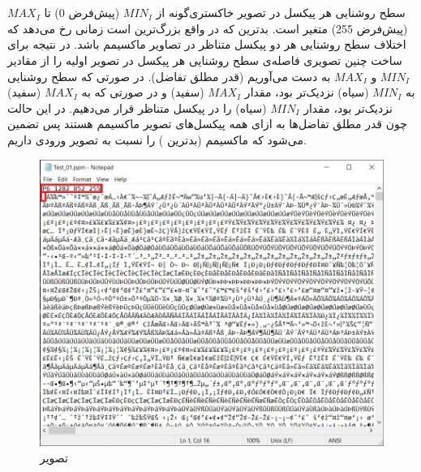 \documentclass{article}
\begin{document}
\section{}%
سطح روشنایی هر پیکسل در تصویر خاکستری‌گونه از $MIN_{I}$ (پیش‌فرض 0) تا $MAX_{I}$ (پیش‌فرض 255) متغیر است. بدترین  که در واقع بزرگ‌ترین  است زمانی رخ می‌دهد که اختلاف سطح روشنایی هر دو پیکسل متناظر در تصاویر ماکسیمم باشد. در نتیجه برای ساخت چنین تصویری فاصله‌ی سطح روشنایی هر پیکسل در تصویر اولیه را از مقادیر $MIN_{I}$ و $MAX_{I}$ به دست می‌آوریم (قدر مطلق تفاضل). در صورتی که سطح روشنایی به $MIN_{I}$ (سیاه) نزدیک‌تر بود، مقدار $MAX_{I}$ (سفید) و در صورتی که به $MAX_{I}$ (سفید) نزدیک‌تر بود، مقدار $MIN_{I}$ (سیاه) را در پیکسل متناظر قرار می‌دهیم. در این حالت چون قدر مطلق تفاضل‌ها به ازای همه پیکسل‌های تصویر ماکسیمم هستند پس تضمین می‌شود که ماکسیمم (بدترین ) را نسبت به تصویر ورودی داریم.
\begin{figure}[H]
    \centering
    \includegraphics[width=1\textwidth]{figures/1a.jpg}
    \caption
	{
تصویر
	}
    \label{fig:fig1}
\end{figure}

\begin{latin}

\end{latin}




\end{document}
